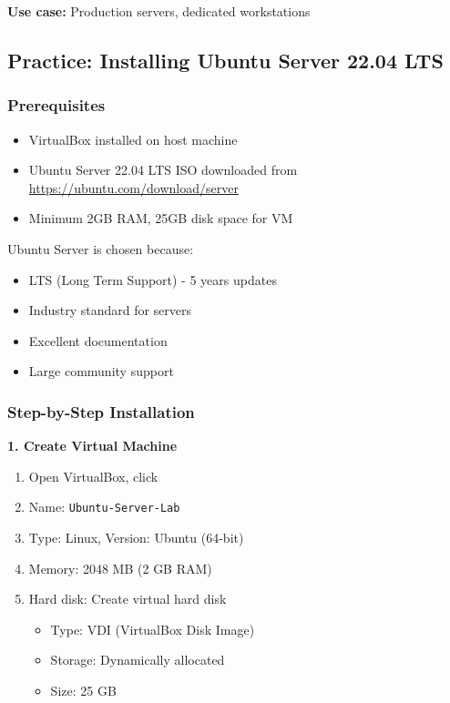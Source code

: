 \textbf{Use case:} Production servers, dedicated workstations

\subsection{Practice: Installing Ubuntu Server 22.04 LTS}

\subsubsection{Prerequisites}

\begin{itemize}
    \item VirtualBox installed on host machine
    \item Ubuntu Server 22.04 LTS ISO downloaded from \url{https://ubuntu.com/download/server}
    \item Minimum 2GB RAM, 25GB disk space for VM
\end{itemize}

\begin{tipbox}
Ubuntu Server is chosen because:
\begin{itemize}
    \item LTS (Long Term Support) - 5 years updates
    \item Industry standard for servers
    \item Excellent documentation
    \item Large community support
\end{itemize}
\end{tipbox}

\subsubsection{Step-by-Step Installation}

\textbf{1. Create Virtual Machine}

\begin{enumerate}
    \item Open VirtualBox, click 
    \item Name: \texttt{Ubuntu-Server-Lab}
    \item Type: Linux, Version: Ubuntu (64-bit)
    \item Memory: 2048 MB (2 GB RAM)
    \item Hard disk: Create virtual hard disk
    \begin{itemize}
        \item Type: VDI (VirtualBox Disk Image)
        \item Storage: Dynamically allocated
        \item Size: 25 GB
    \end{itemize}
\end{enumerate}

